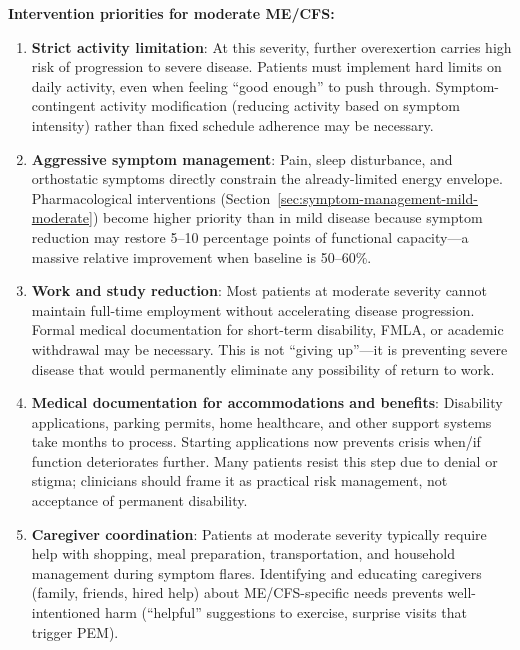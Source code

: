 \textbf{Intervention priorities for moderate ME/CFS:}

\begin{enumerate}
    \item \textbf{Strict activity limitation}: At this severity, further overexertion carries high risk of progression to severe disease. Patients must implement hard limits on daily activity, even when feeling ``good enough'' to push through. Symptom-contingent activity modification (reducing activity based on symptom intensity) rather than fixed schedule adherence may be necessary.

    \item \textbf{Aggressive symptom management}: Pain, sleep disturbance, and orthostatic symptoms directly constrain the already-limited energy envelope. Pharmacological interventions (Section~\ref{sec:symptom-management-mild-moderate}) become higher priority than in mild disease because symptom reduction may restore 5--10 percentage points of functional capacity---a massive relative improvement when baseline is 50--60\%.

    \item \textbf{Work and study reduction}: Most patients at moderate severity cannot maintain full-time employment without accelerating disease progression. Formal medical documentation for short-term disability, FMLA, or academic withdrawal may be necessary. This is not ``giving up''---it is preventing severe disease that would permanently eliminate any possibility of return to work.

    \item \textbf{Medical documentation for accommodations and benefits}: Disability applications, parking permits, home healthcare, and other support systems take months to process. Starting applications now prevents crisis when/if function deteriorates further. Many patients resist this step due to denial or stigma; clinicians should frame it as practical risk management, not acceptance of permanent disability.

    \item \textbf{Caregiver coordination}: Patients at moderate severity typically require help with shopping, meal preparation, transportation, and household management during symptom flares. Identifying and educating caregivers (family, friends, hired help) about ME/CFS-specific needs prevents well-intentioned harm (``helpful'' suggestions to exercise, surprise visits that trigger PEM).
\end{enumerate}


